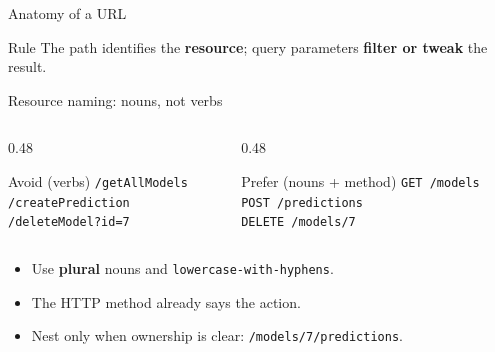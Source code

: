 \documentclass[aspectratio=169,10pt]{beamer}
\begin{document}
\begin{frame}{Anatomy of a URL}
\begin{center}
\end{center}
\begin{block}{Rule}
The path identifies the \textbf{resource}; query parameters \textbf{filter or tweak} the result.
\end{block}
\end{frame}

\begin{frame}{Resource naming: nouns, not verbs}
\begin{columns}[T]
\begin{column}{0.48\textwidth}
\begin{alertblock}{Avoid (verbs)}
\texttt{/getAllModels}\\
\texttt{/createPrediction}\\
\texttt{/deleteModel?id=7}
\end{alertblock}
\end{column}
\begin{column}{0.48\textwidth}
\begin{exampleblock}{Prefer (nouns + method)}
\texttt{GET /models}\\
\texttt{POST /predictions}\\
\texttt{DELETE /models/7}
\end{exampleblock}
\end{column}
\end{columns}
\vspace{0.3cm}
\begin{itemize}
\item Use \textbf{plural} nouns and \texttt{lowercase-with-hyphens}.
\item The HTTP method already says the action.
\item Nest only when ownership is clear: \texttt{/models/7/predictions}.
\end{itemize}
\end{frame}
\end{document}
